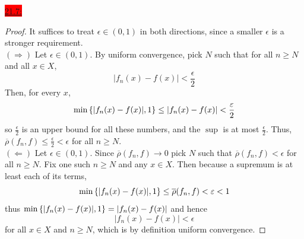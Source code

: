 \documentclass{exam}
\begin{document}
\colorbox{red}{\underline{21.7:}}
\begin{solution}
    \begin{proof}
        It suffices to treat $\epsilon \in (0, 1)$ in both directions, since a smaller $\epsilon$ is a stronger requirement. \\
        $(\Rightarrow)$ Let $\epsilon \in (0, 1)$. By uniform convergence, pick $N$ such that for all $n \geq N$ and all $x \in X$, 
        \[
            |f_n(x) - f(x)| < \frac{\epsilon}{2}
        \]
        Then, for every $x$, 
        \[
            \min\left\{|f_n(x) - f(x)|, 1 \right\} \leq |f_n(x) - f(x)| < \frac{\varepsilon}{2}
        \]
        so $\frac{\epsilon}{2}$ is an upper bound for all these numbers, and the $\sup$ is at most $\frac{\epsilon}{2}$. Thus, $\overline{\rho}(f_n, f) \leq \frac{\epsilon}{2} < \epsilon$ for all $n \geq N$. \\
        $(\Leftarrow)$ Let $\epsilon \in (0, 1)$. Since $\overline{\rho}(f_n, f) \to 0$ pick $N$ such that $\overline{\rho}(f_n, f) < \epsilon$ for all $n \geq N$. Fix one such $n \geq N$ and any $x \in X$. Then because a supremum is at least each of its terms, 
        \[
            \min\left\{|f_n(x) - f(x)|, 1 \right\} \leq \overline{\rho}(f_n, f) < \varepsilon < 1
        \]
        thus $\min\left\{|f_n(x) - f(x)|, 1 \right\} = |f_n(x) - f(x)|$ and hence 
        \[
            |f_n(x) - f(x)| < \epsilon
        \]
        for all $x \in X$ and $n \geq N$, which is by definition uniform convergence.
    \end{proof}
\end{solution}
\end{document}

